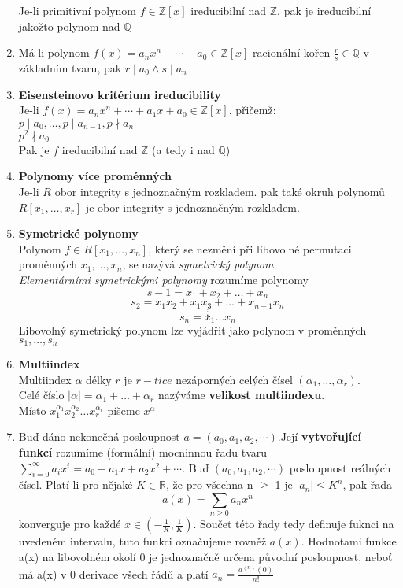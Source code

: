 \documentclass[12pt,a4paper]{article}
\begin{document}
\begin{enumerate}
					Je-li primitivní polynom $f \in \mathbb{Z}[x]$ ireducibilní  nad $\mathbb{Z}$, pak je ireducibilní jakožto polynom nad $\mathbb{Q}$
				\item Má-li polynom $f(x) = a_nx^n+\cdots+a_0 \in \mathbb{Z}[x]$ racionální kořen $\frac{r}{s} \in \mathbb{Q}$ v základním tvaru, pak $r \mid a_0 \land s \mid a_n$
				\item \textbf{Eisensteinovo kritérium ireducibility}\\
					Je-li $f(x) = a_nx^n+\cdots+a_1x+a_0 \in \mathbb{Z}[x]$, přičemž:\\
					$p \mid a_0, \dots, p \mid a_{n-1},p \nmid a_n$\\
					$p^2 \nmid a_0$\\
					Pak je $f$ ireducibilní nad $\mathbb{Z}$ (a tedy i nad $\mathbb{Q}$)
				\item \textbf{Polynomy více proměnných}\\
					Je-li $R$ obor integrity s jednoznačným rozkladem. pak také okruh polynomů $R[x_1,\dots,x_r]$ je obor integrity s jednoznačným rozkladem.
				\item \textbf{Symetrické polynomy}\\
					Polynom $f \in R[x_1,\dots,x_n]$, který se nezmění při libovolné permutaci proměnných $x_1,\dots,x_n$, se nazývá \textit{symetrický polynom}.\\ \textit{Elementárními symetrickými polynomy} rozumíme polynomy\\
					\[s-1 = x_1 + x_2 + \dots + x_n  \]\[  s_2 = x_1x_2 + x_1x_3 + \dots + x_{n-1}x_n\] \[\vdots\]\[s_n=x_1\dots x_n\]
					Libovolný symetrický polynom lze vyjádřit jako polynom v proměnných $s_1,\dots,s_n$
				\item \textbf{Multiindex}\\
					Multiindex $\alpha$ délky $r$ je  $r-tice$ nezáporných celých čísel $(\alpha_1,\dots,\alpha_r)$.\\ Celé číslo $|\alpha| = \alpha_1+\dots+\alpha_r$ nazýváme \textbf{velikost multiindexu}.\\Místo $x_1^{\alpha_1}x_2^{\alpha_2} \dots x_r^{\alpha_r}$ píšeme $x^\alpha$
			
		
		
		\item Buď dáno nekonečná posloupnost $a=(a_0,a_1,a_2,\cdots)$.Její \textbf{vytvořující funkcí} rozumíme (formální) mocninnou řadu tvaru $\sum_{i=0}^{\infty}a_ix^i=a_0+a_1x+a_2x^2+\cdots$.
		\vspace{4mm}
		Buď $(a_0,a_1,a_2,\cdots)$ posloupnost reálných čísel. Platí-li pro nějaké $K \in \mathbb{R}$, že pro všechna n $\geq$ 1 je $|a_n|\leq K^n$, pak řada \[a(x)=\sum_{n\geq0}a_nx^n\] konverguje pro každé $x\in(-\frac{1}{K},\frac{1}{K})$. Součet této řady tedy definuje fuknci na uvedeném intervalu, tuto funkci označujeme rovněž $a(x)$. Hodnotami funkce a(x) na libovolném okolí 0 je jednoznačně určena původní posloupnost, neboť má a(x) v 0 derivace všech řádů a platí $a_n = \frac{a^{(n)}(0)}{n!}$
		
	\end{enumerate}
	
	
\end{document}
